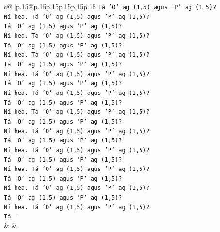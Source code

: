\documentclass{article}
\begin{document}
{\begin{supertabular}{c@{$\;$}|p{.15\linewidth}@{}p{.15\linewidth}p{.15\linewidth}p{.15\linewidth}p{.15\linewidth}p{.15\linewidth}}
{{{\texttt{Tá 'O' ag (1,5) agus 'P' ag (1,5)?} \\
\texttt{Ní hea. Tá 'O' ag (1,5) agus 'P' ag (1,5)?} \\
\texttt{Tá 'O' ag (1,5) agus 'P' ag (1,5)?} \\
\texttt{Ní hea. Tá 'O' ag (1,5) agus 'P' ag (1,5)?} \\
\texttt{Tá 'O' ag (1,5) agus 'P' ag (1,5)?} \\
\texttt{Ní hea. Tá 'O' ag (1,5) agus 'P' ag (1,5)?} \\
\texttt{Tá 'O' ag (1,5) agus 'P' ag (1,5)?} \\
\texttt{Ní hea. Tá 'O' ag (1,5) agus 'P' ag (1,5)?} \\
\texttt{Tá 'O' ag (1,5) agus 'P' ag (1,5)?} \\
\texttt{Ní hea. Tá 'O' ag (1,5) agus 'P' ag (1,5)?} \\
\texttt{Tá 'O' ag (1,5) agus 'P' ag (1,5)?} \\
\texttt{Ní hea. Tá 'O' ag (1,5) agus 'P' ag (1,5)?} \\
\texttt{Tá 'O' ag (1,5) agus 'P' ag (1,5)?} \\
\texttt{Ní hea. Tá 'O' ag (1,5) agus 'P' ag (1,5)?} \\
\texttt{Tá 'O' ag (1,5) agus 'P' ag (1,5)?} \\
\texttt{Ní hea. Tá 'O' ag (1,5) agus 'P' ag (1,5)?} \\
\texttt{Tá 'O' ag (1,5) agus 'P' ag (1,5)?} \\
\texttt{Ní hea. Tá 'O' ag (1,5) agus 'P' ag (1,5)?} \\
\texttt{Tá 'O' ag (1,5) agus 'P' ag (1,5)?} \\
\texttt{Ní hea. Tá 'O' ag (1,5) agus 'P' ag (1,5)?} \\
\texttt{Tá 'O' ag (1,5) agus 'P' ag (1,5)?} \\
\texttt{Ní hea. Tá 'O' ag (1,5) agus 'P' ag (1,5)?} \\
\texttt{Tá '} \\
            }
        }
    }
    & & \\ \\


\end{supertabular}}
\end{document}
